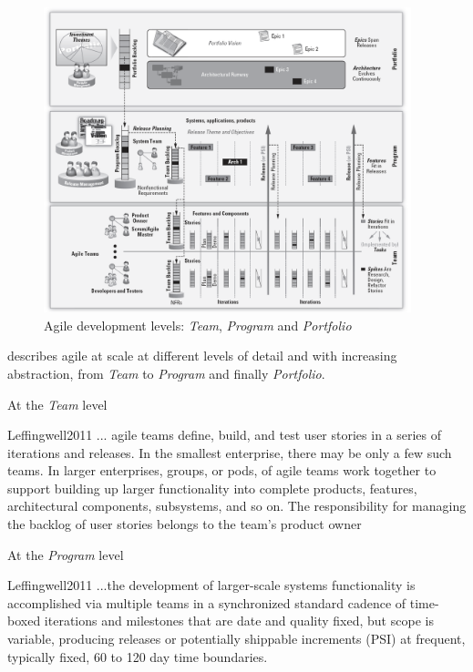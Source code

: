 \documentclass[dissertation,final]{softeng}
\begin{document}
\begin{figure}[h]
\includegraphics[width=0.95\textwidth]{ScaledAgileFrameworkbw}
\centering
\caption[Agile enterprise]{Agile development levels: \emph{Team}, \emph{Program} and \emph{Portfolio}~\citep{Leffingwell2011}}
\label{fig:scaled_agile_framework}
\end{figure}

\citeauthor{Leffingwell2011} describes agile at scale at different levels of detail and with increasing abstraction, from \emph{Team} to \emph{Program} and finally \emph{Portfolio}. 

At the \emph{Team} level
\begin{displaycquote}{Leffingwell2011}
... agile teams define, build, and test user stories in a series of iterations and releases. In the smallest enterprise, there may be only a few such teams. In larger enterprises, groups, or pods, of agile teams work together to support building up larger functionality into complete products, features, architectural components, subsystems, and so on. The responsibility for managing the backlog of user stories belongs to the team's product owner
\end{displaycquote}

At the \emph{Program} level
\begin{displaycquote}{Leffingwell2011}
...the development of larger-scale systems functionality is accomplished via multiple teams in a synchronized standard cadence of time-boxed iterations and milestones that are date and quality fixed, but scope is variable, producing releases or potentially shippable increments (PSI) at frequent, typically fixed, 60 to 120 day time boundaries.
\end{displaycquote}
\end{document}
